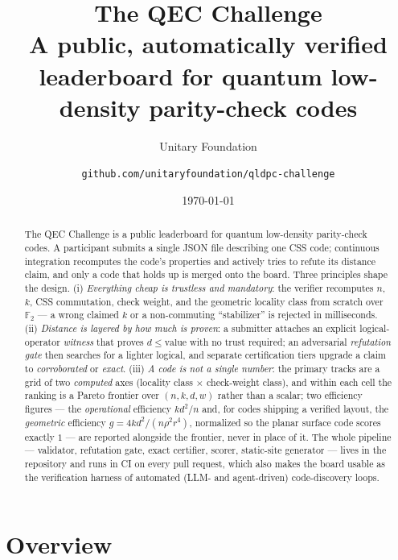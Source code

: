 \documentclass[11pt]{article}
\title{\textbf{The QEC Challenge}\\[4pt]
	\large A public, automatically verified leaderboard for quantum
	low-density parity-check codes}
\author{Unitary Foundation \and
	\texttt{github.com/unitaryfoundation/qldpc-challenge}}
\date{\vspace{-2ex}\today}
\newcommand{\GF}{\mathbb{F}_2}
\newcommand{\eff}{kd^2/n}
\newcommand{\geff}{4kd^2/(n\rho^2 r^4)}
\begin{document}
	\maketitle

	\begin{abstract}
		The QEC Challenge is a public leaderboard for quantum low-density
		parity-check codes. A participant submits a single JSON file describing
		one CSS code; continuous integration recomputes the code's properties
		and actively tries to refute its distance claim, and only a code that
		holds up is merged onto the board. Three principles shape the design.
		(i) \emph{Everything cheap is trustless and mandatory}: the verifier
		recomputes $n$, $k$, CSS commutation, check weight, and the geometric
		locality class from scratch over $\GF$ --- a wrong claimed $k$ or a
		non-commuting ``stabilizer'' is rejected in milliseconds. (ii)
		\emph{Distance is layered by how much is proven}: a submitter attaches
		an explicit logical-operator \emph{witness} that proves
		$d\le\text{value}$ with no trust required; an adversarial
		\emph{refutation gate} then searches for a lighter logical, and
		separate certification tiers upgrade a claim to \emph{corroborated} or
		\emph{exact}. (iii) \emph{A code is not a single number}: the primary
		tracks are a grid of two \emph{computed} axes (locality class $\times$
		check-weight class), and within each cell the ranking is a Pareto
		frontier over $(n,k,d,w)$ rather than a scalar; two efficiency figures
		--- the \emph{operational} efficiency $\eff$ and, for codes shipping a
		verified layout, the \emph{geometric} efficiency $g=\geff$, normalized
		so the planar surface code scores exactly $1$ --- are reported
		alongside the frontier, never in place of it. The whole pipeline ---
		validator, refutation gate, exact certifier, scorer, static-site
		generator --- lives in the repository and runs in CI on every pull
		request, which also makes the board usable as the verification harness
		of automated (LLM- and agent-driven) code-discovery loops.
	\end{abstract}

	\section{Overview}
\end{document}
